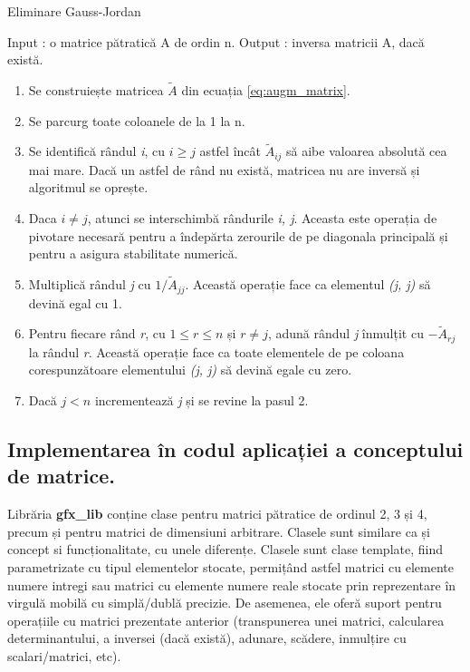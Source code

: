 \begin{algorithm}
\caption{Eliminare Gauss-Jordan}
\label{alg:gauss_jordan_elim}
\begin{algorithmic}
\STATE Input : o matrice pătratică A de ordin n.
\STATE Output : inversa matricii A, dacă există.
\begin{enumerate}[{Pas} 1.]
  \item Se construiește matricea $\tilde{A}$ din ecuația \eqref{eq:augm_matrix}.
  \item Se parcurg toate coloanele de la 1 la n.
  \item Se identifică rândul \textit{i}, cu $\mathit{i \geq j}$ astfel încât
  $\tilde{A}_{ij}$ să aibe valoarea absolută cea mai mare. Dacă un astfel de
  rând nu există, matricea nu are inversă și algoritmul se oprește.
  \item Daca $\mathit{i \neq j}$, atunci se interschimbă rândurile 
  \textit{i, j}. Aceasta este operația de pivotare necesară pentru a îndepărta
  zerourile de pe diagonala principală și pentru a asigura stabilitate numerică.
  \item Multiplică rândul \textit{j} cu $1 \text{/} \tilde{A}_{jj}$. Această
  operație face ca elementul \textit{(j, j)} să devină egal cu 1.
  \item Pentru fiecare rând \textit{r}, cu $\mathit{1 \leq r \leq n}$ și $r
  \neq j$, adună rândul \textit{j} înmulțit cu $-\tilde{A}_{rj}$ la rândul
  \textit{r}. Această operație face ca toate elementele de pe coloana
  corespunzătoare elementului \textit{(j, j)} să devină egale cu zero.
  \item Dacă $\mathit{j < n}$ incrementează \textit{j} și se revine la pasul 2.
\end{enumerate}
\end{algorithmic}
\end{algorithm}

\subsection{Implementarea în codul aplicației a conceptului de matrice.}
\label{ch1:sec_matrix:sub_matrix_appcode}
\indent

Librăria \textbf{gfx\_lib} conține clase pentru matrici pătratice de ordinul 2,
3 și 4, precum și pentru matrici de dimensiuni arbitrare. Clasele sunt
similare ca și concept si funcționalitate, cu unele diferențe. Clasele sunt clase template,
fiind parametrizate cu tipul elementelor stocate, permițând astfel matrici cu
elemente numere intregi sau matrici cu elemente numere reale stocate prin
reprezentare în virgulă mobilă cu simplă/dublă precizie. De asemenea, ele oferă
suport pentru operațiile cu matrici prezentate anterior (transpunerea unei
matrici, calcularea determinantului, a inversei (dacă există), adunare,
scădere, inmulțire cu scalari/matrici, etc).
